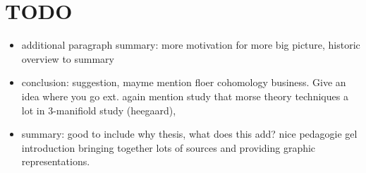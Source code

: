 \chapter*{TODO}
\begin{itemize}
    \item additional paragraph summary: more motivation for more big picture, historic overview  to summary
    \item conclusion: suggestion, mayme mention floer cohomology business. Give an idea where you go ext.  again mention study that morse theory techniques a lot in 3-manifiold study (heegaard), 
    \item summary: good to include  why thesis, what does this add? nice pedagogie gel introduction bringing together lots of sources and providing graphic representations.
\end{itemize}
